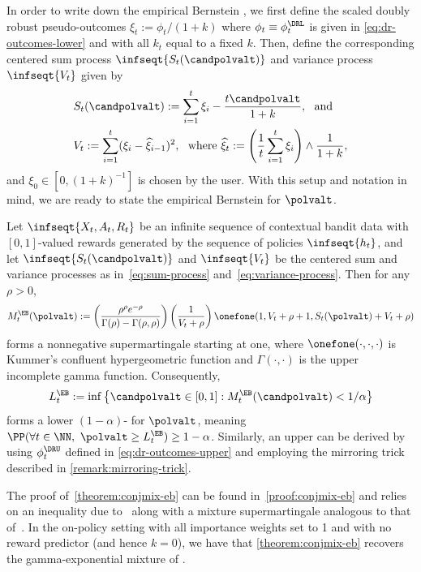 In order to write down the empirical Bernstein \cs{}, we first define the scaled doubly robust pseudo-outcomes $\xi_t := \phi_t / (1+k)$ where $\phi_t \equiv \phi_t^\DRL$ is given in \eqref{eq:dr-outcomes-lower} and with all $k_t$ equal to a fixed $k$. Then, define the corresponding centered sum process $\infseqt{S_t(\candpolvalt)}$ and variance process $\infseqt{V_t}$ given by
\begin{align}
  &S_t(\candpolvalt) := \sum_{i=1}^t \xi_i - \frac{t\candpolvalt}{1 + k}, ~~\text{and} \label{eq:sum-process}\\
  &V_t := \sum_{i=1}^t (\xi_i - \widehat \xi_{i-1})^2, ~~\text{where } \widehat \xi_{t} :=  \left ( \frac{1}{t} \sum_{i=1}^{t} \xi_i \right )\land \frac{1}{1 + k}, \label{eq:variance-process}
\end{align}
and $\xi_0 \in [0, (1+k)^{-1}]$ is chosen by the user. With this setup and notation in mind, we are ready to state the empirical Bernstein \cs{} for $\polvalt$.

\begin{theorem}\label{theorem:conjmix-eb}
  Let $\infseqt{X_t, A_t, R_t}$ be an infinite sequence of contextual bandit data with $[0, 1]$-valued rewards generated by the sequence of policies $\infseqt{h_t}$, and let $\infseqt{S_t(\candpolvalt)}$ and $\infseqt{V_t}$ be the centered sum and variance processes as in~\eqref{eq:sum-process} and~\eqref{eq:variance-process}. Then for any $\rho > 0$,
  \begin{equation}\label{eq:gamma-exponential-nsm}
M_t^\EB(\polvalt) := \left(\frac{\rho^\rho e^{-\rho}}{\Gamma(\rho) - \Gamma(\rho, \rho)}\right) \left(\frac{1}{V_t + \rho}\right) \onefone(1, V_t + \rho + 1, S_t(\polvalt) + V_t + \rho)
  \end{equation}
  forms a nonnegative supermartingale starting at one, where $\onefone(\cdot, \cdot ,\cdot )$ is Kummer's confluent hypergeometric function and $\Gamma(\cdot, \cdot)$ is the upper incomplete gamma function. Consequently,
  \begin{equation}
    L_t^\EB := \inf \left \{ \candpolvalt \in [0, 1] : M_t^\EB(\candpolvalt) < 1/\alpha \right \}
  \end{equation}
  forms a lower $(1-\alpha)$-\cs{} for $\polvalt$, meaning $\PP(\forall t \in \NN,\ \polvalt \geq L_t^\EB) \geq 1-\alpha$. Similarly, an upper \cs{} can be derived by using $\phi_t^\DRU$ defined in \eqref{eq:dr-outcomes-upper} and employing the mirroring trick described in \cref{remark:mirroring-trick}.
\end{theorem}
The proof of~\cref{theorem:conjmix-eb} can be found in~\cref{proof:conjmix-eb} and relies on an inequality due to~\citet{fan2015exponential} along with a mixture supermartingale analogous to that of~\citet[Proposition 9]{howard2018uniform}. In the on-policy setting with all importance weights set to 1 and with no reward predictor (and hence $k = 0$), we have that \cref{theorem:conjmix-eb} recovers the gamma-exponential mixture \cs{} of \citet[Proposition 9]{howard2018uniform}.

